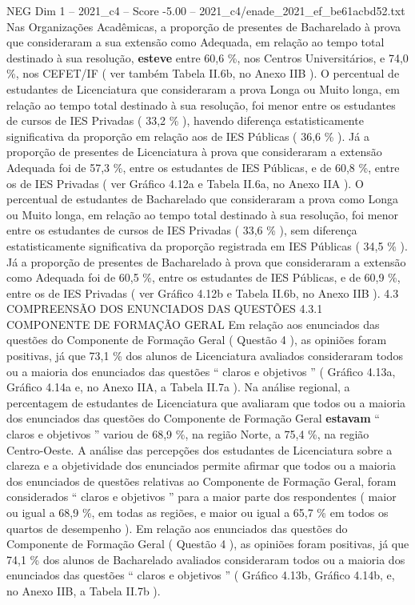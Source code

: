 \begin{textsample}{NEG Dim 1 – 2021\_c4 – Score -5.00 – 2021\_c4/enade\_2021\_ef\_be61acbd52.txt}
Nas Organizações Acadêmicas, a proporção de presentes de Bacharelado à prova que consideraram a sua extensão como Adequada, em relação ao tempo total destinado à sua resolução, \textbf{esteve} entre 60,6 \%, nos Centros Universitários, e 74,0 \%, nos CEFET/IF ( ver também Tabela II.6b, no Anexo IIB ).
O percentual de estudantes de Licenciatura que consideraram a prova Longa ou Muito longa, em relação ao tempo total destinado à sua resolução, foi menor entre os estudantes de cursos de IES Privadas ( 33,2 \% ), havendo diferença estatisticamente significativa da proporção em relação aos de IES Públicas ( 36,6 \% ).
Já a proporção de presentes de Licenciatura à prova que consideraram a extensão Adequada foi de 57,3 \%, entre os estudantes de IES Públicas, e de 60,8 \%, entre os de IES Privadas ( ver Gráfico 4.12a e Tabela II.6a, no Anexo IIA ).
O percentual de estudantes de Bacharelado que consideraram a prova como Longa ou Muito longa, em relação ao tempo total destinado à sua resolução, foi menor entre os estudantes de cursos de IES Privadas ( 33,6 \% ), sem diferença estatisticamente significativa da proporção registrada em IES Públicas ( 34,5 \% ).
Já a proporção de presentes de Bacharelado à prova que consideraram a extensão como Adequada foi de 60,5 \%, entre os estudantes de IES Públicas, e de 60,9 \%, entre os de IES Privadas ( ver Gráfico 4.12b e Tabela II.6b, no Anexo IIB ). 4.3 COMPREENSÃO DOS ENUNCIADOS DAS QUESTÕES 4.3.1 COMPONENTE DE FORMAÇÃO GERAL Em relação aos enunciados das questões do Componente de Formação Geral ( Questão 4 ), as opiniões foram positivas, já que 73,1 \% dos alunos de Licenciatura avaliados consideraram todos ou a maioria dos enunciados das questões “ claros e objetivos ” ( Gráfico 4.13a, Gráfico 4.14a e, no Anexo IIA, a Tabela II.7a ).
Na análise regional, a percentagem de estudantes de Licenciatura que avaliaram que todos ou a maioria dos enunciados das questões do Componente de Formação Geral \textbf{estavam} “ claros e objetivos ” variou de 68,9 \%, na região Norte, a 75,4 \%, na região Centro-Oeste.
A análise das percepções dos estudantes de Licenciatura sobre a clareza e a objetividade dos enunciados permite afirmar que todos ou a maioria dos enunciados de questões relativas ao Componente de Formação Geral, foram considerados “ claros e objetivos ” para a maior parte dos respondentes ( maior ou igual a 68,9 \%, em todas as regiões, e maior ou igual a 65,7 \% em todos os quartos de desempenho ).
Em relação aos enunciados das questões do Componente de Formação Geral ( Questão 4 ), as opiniões foram positivas, já que 74,1 \% dos alunos de Bacharelado avaliados consideraram todos ou a maioria dos enunciados das questões “ claros e objetivos ” ( Gráfico 4.13b, Gráfico 4.14b, e, no Anexo IIB, a Tabela II.7b ).

\end{textsample}
